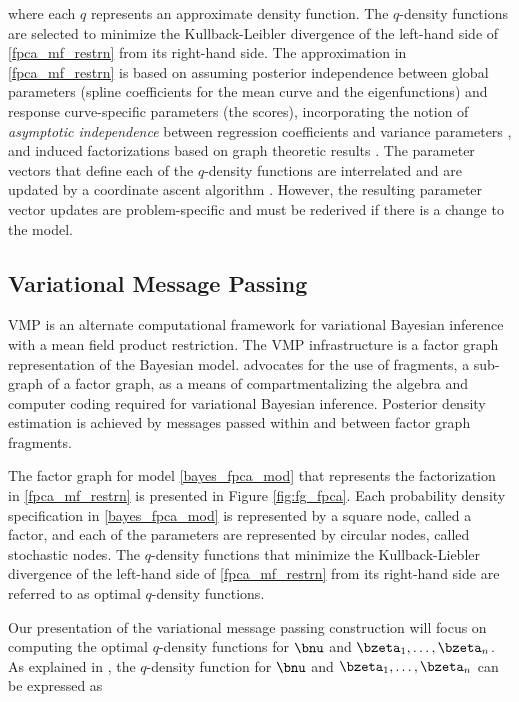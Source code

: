 \documentclass[ba]{imsart}
\numberwithin{equation}{section}
\theoremstyle{plain}
\begin{document}
\noindent where each $q$ represents an approximate density function. The $q$-density functions are
selected to minimize the Kullback-Leibler divergence of the left-hand side of \eqref{fpca_mf_restrn}
from its right-hand side.
The approximation in \eqref{fpca_mf_restrn} is based on assuming posterior independence between
global parameters (spline coefficients for the mean curve and the eigenfunctions)
and response curve-specific parameters (the scores), incorporating the notion of
\emph{asymptotic independence} between regression coefficients and variance parameters
\cite[Section~3.1]{menictas13}, and induced factorizations based on graph theoretic
results \cite[Section~10.2.5]{bishop06}.
The parameter vectors that define each of the $q$-density
functions are interrelated and are updated
by a coordinate ascent algorithm \cite[Algorithm~1]{ormerod10}. However, the resulting parameter vector updates
are problem-specific and must be rederived if there is a change to the model.


\subsection{Variational Message Passing}
\label{sec:vmp}

VMP is an alternate computational framework for variational Bayesian inference with a mean field product restriction.
The VMP infrastructure is a factor graph representation of the Bayesian model. \citet{wand17} advocates for
the use of fragments, a sub-graph of a factor graph, as a means of compartmentalizing the algebra and computer
coding required for variational Bayesian inference. Posterior density estimation is achieved by messages passed
within and between factor graph fragments.

The factor graph for model \eqref{bayes_fpca_mod} that represents the factorization in \eqref{fpca_mf_restrn}
is presented in Figure \ref{fig:fg_fpca}. Each probability density specification in \eqref{bayes_fpca_mod} is
represented by a square node, called a factor, and each of the parameters are represented by circular nodes,
called stochastic nodes. The $q$-density functions that minimize the Kullback-Liebler divergence of
the left-hand side of \eqref{fpca_mf_restrn} from its right-hand side are referred to as optimal $q$-density
functions.

Our presentation of the variational message passing construction will focus on computing the optimal $q$-density
functions for $\bnu$ and $\bzeta_1, \dots, \bzeta_n$. As explained in \citet{minka05}, the $q$-density function for
$\bnu$ and $\bzeta_1, \dots, \bzeta_n$ can be expressed as
\end{document}
